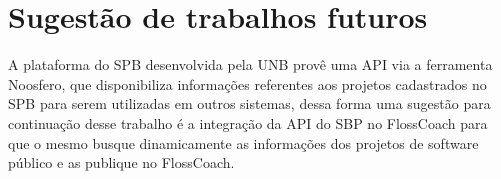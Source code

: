 \section{Sugestão de trabalhos futuros}

A plataforma do SPB desenvolvida pela UNB provê uma API via a ferramenta Noosfero,
que disponibiliza informações referentes aos projetos cadastrados no SPB para
serem utilizadas em outros sistemas, dessa forma uma sugestão para continuação
desse trabalho é a integração da API do SBP no FlossCoach para que o mesmo 
busque dinamicamente as informações dos projetos de software público e as
publique no FlossCoach.



